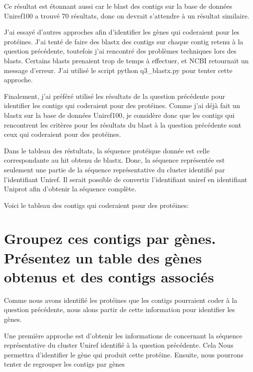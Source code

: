 \documentclass[10.9pt]{article} %
\begin{document}
Ce résultat est étonnant aussi car le blast des contigs sur la base de données Uniref100 a trouvé 70 résultats, donc
on devrait s'attendre à un résultat similaire. 

J'ai essayé d'autres approches afin d'identifier les gènes qui coderaient pour les protéines. J'ai tenté de faire des
blastx des contigs sur chaque contig retenu à la question précédente, toutefois j'ai rencontré des problèmes techniques
lors des blasts. Certains blasts prenaient trop de temps à effectuer, et NCBI retournait un message d'erreur.
J'ai utilisé le script python q3\_blastx.py pour tenter cette approche.

Finalement, j'ai préféré utilisé les résultats de la question précédente pour identifier les contigs qui coderaient
pour des protéines. Comme j'ai déjà fait un blastx sur la base de données Uniref100, je considère donc que les contigs
qui rencontrent les critères pour les résultats du blast à la question précédente sont ceux qui coderaient pour des
protéines.

Dans le tableau des réstultats, la séquence protéique donnée est celle correspondante au hit obtenu de blastx. Donc, 
la séquence représentée est seulement une partie de la séquence représentative du cluster identifié par l'identifiant
Uniref. Il serait possible de convertir l'identifiant uniref en identifiant Uniprot afin d'obtenir la séquence complète.


Voici le tableau des contigs qui coderaient pour des protéines:






\section{Groupez ces contigs par gènes. Présentez un table des gènes obtenus et des contigs
associés} %

Comme nous avons identifié les protéines que les contigs pourraient coder à la question 
précédente, nous alons partir de cette information pour identifier les gènes.

Une première approche est d'obtenir les informations de concernant la séquence représentative
du cluster Uniref identifié à la question précédente. Cela Nous permettra d'identifier le
gène qui produit cette protéine. Ensuite, nous pourrons tenter de regrouper les contigs
par gènes
\end{document}
